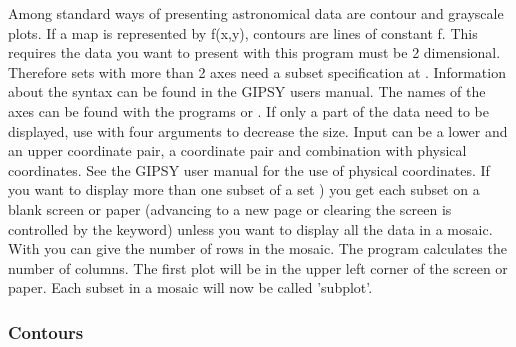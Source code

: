 Among standard ways of presenting astronomical data are
contour and grayscale plots. If a map is represented by
f(x,y), contours are lines of constant f. This requires
the data you want to present with this program must be 2
dimensional. Therefore sets with more than 2 axes need a
subset specification at . Information about the
syntax can be found in the GIPSY users manual. The names
of the axes can be found with the programs 
or .
If only a part of the data need to be displayed, use  
with four arguments to decrease the size. Input can be a
lower and an upper coordinate pair, a coordinate pair and 
combination with physical coordinates. See the GIPSY user
manual for the use of physical coordinates. If you want to
display more than one subset of a set 
)
you get each subset on a blank screen or paper (advancing 
to a new page or clearing the screen is controlled by the
 keyword) unless you want to display all the data 
in a mosaic. With  you can give the number of rows 
in the mosaic. The program calculates the number of columns. 
The first plot will be in the upper left corner of the 
screen or paper. Each subset in a mosaic will now be
called 'subplot'. 


\subsubsection*{Contours}
                            
